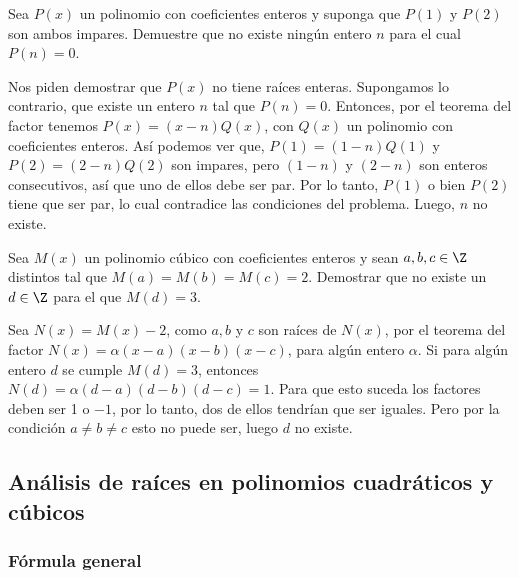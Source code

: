 \begin{example}
    Sea $P(x)$ un polinomio con coeficientes enteros y suponga que $P(1)$ y $P(2)$ son ambos impares.
    Demuestre que no existe ningún entero $n$ para el cual $P(n) = 0$.
\end{example}
\begin{solution}
    Nos piden demostrar que $P(x)$ no tiene raíces enteras.
    Supongamos lo contrario, que existe un entero $n$ tal que $P(n) = 0$.
    Entonces, por el teorema del factor tenemos $P(x) = (x - n)Q(x)$, con $Q(x)$ un polinomio con coeficientes enteros.
    Así podemos ver que, $P(1) = (1 - n)Q(1)$ y $P(2) = (2 - n)Q(2)$ son impares, pero $(1 - n)$ y $(2 - n)$ son enteros consecutivos, así que uno de ellos debe ser par.
    Por lo tanto, $P(1)$ o bien $P(2)$ tiene que ser par, lo cual contradice las condiciones del problema.
    Luego, $n$ no existe.
\end{solution}

\begin{example}
    Sea $M(x)$ un polinomio cúbico con coeficientes enteros y sean $a, b, c \in \Z$ distintos tal que $M(a) = M(b) = M(c) = 2$.
    Demostrar que no existe un $d \in \Z$ para el que $M(d) = 3.$
\end{example}
\begin{solution}
    Sea $N(x) = M(x) - 2$, como $a, b$ y $c$ son raíces de $N(x)$, por el teorema del factor $N(x) = \alpha (x - a)(x - b)(x - c)$, para algún entero $\alpha$.
    Si para algún entero $d$ se cumple $M(d) = 3$, entonces $N(d) = \alpha (d - a)(d - b)(d - c) = 1$.
    Para que esto suceda los factores deben ser 1 o $-1$, por lo tanto, dos de ellos tendrían que ser iguales.
    Pero por la condición $a \neq b \neq c$ esto no puede ser, luego $d$ no existe.
\end{solution}



\subsection{Análisis de raíces en polinomios cuadráticos y cúbicos}

\subsubsection{Fórmula general}


